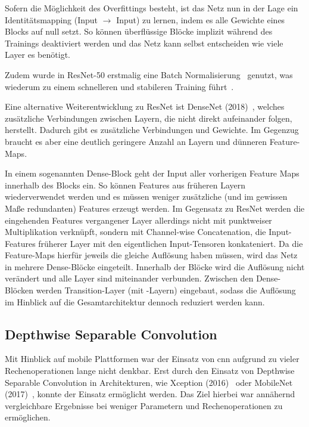 Sofern die Möglichkeit des Overfittings besteht, ist das Netz nun in der Lage ein Identitätsmapping (Input $\to$ Input) zu lernen, indem es alle Gewichte eines Blocks auf null setzt.
So können überflüssige Blöcke implizit während des Trainings deaktiviert werden und das Netz kann selbst entscheiden wie viele Layer es benötigt.

Zudem wurde in ResNet-50 erstmalig eine Batch Normalisierung~\cite{Ioffe15} genutzt, was wiederum zu einem schnelleren und stabileren Training führt~\cite{Gugger20}.


Eine alternative Weiterentwicklung zu ResNet ist DenseNet (2018)~\cite{Huang18}, welches zusätzliche Verbindungen zwischen Layern, die nicht direkt aufeinander folgen, herstellt.
Dadurch gibt es zusätzliche Verbindungen und Gewichte.
Im Gegenzug braucht es aber eine deutlich geringere Anzahl an Layern und dünneren Feature-Maps.

In einem sogenannten Dense-Block geht der Input aller vorherigen Feature Maps innerhalb des Blocks ein.
So können Features aus früheren Layern wiederverwendet werden und es müssen weniger zusätzliche (und im gewissen Maße redundanten) Features erzeugt werden.
Im Gegensatz zu ResNet werden die eingehenden Features vergangener Layer allerdings nicht mit punktweiser Multiplikation verknüpft, sondern mit Channel-wise Concatenation, \dh die Input-Features früherer Layer mit den eigentlichen Input-Tensoren konkateniert.
Da die Feature-Maps hierfür jeweils die gleiche Auflösung haben müssen, wird das Netz in mehrere Dense-Blöcke eingeteilt.
Innerhalb der Blöcke wird die Auflösung nicht verändert und alle Layer sind miteinander verbunden.
Zwischen den Dense-Blöcken werden Transition-Layer (\ua mit \pool-Layern) eingebaut, sodass die Auflösung im Hinblick auf die Gesamtarchitektur dennoch reduziert werden kann.

\subsection{Depthwise Separable Convolution}
\label{subsec:group-conv}

Mit Hinblick auf mobile Plattformen war der Einsatz von \gls{cnn} aufgrund zu vieler Rechenoperationen lange nicht denkbar.
Erst durch den Einsatz von Depthwise Separable Convolution in Architekturen, wie Xception (2016)~\cite{Chollet17} oder MobileNet (2017)~\cite{Howard17}, konnte der Einsatz ermöglicht werden.
Das Ziel hierbei war annähernd vergleichbare Ergebnisse bei weniger Parametern und Rechenoperationen zu ermöglichen.

